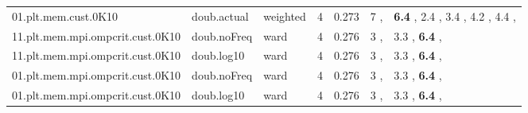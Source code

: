 \begin{table*}[]
{\begin{tabular}{|l|l|l|c|r|l|l|}
 01.plt.mem.cust.0K10             & doub.actual  & weighted      &        4 &     0.273 & 7 ,                & \textbf{6.4} , 2.4 , 3.4 , 4.2 , 4.4 ,       \\
 11.plt.mem.mpi.ompcrit.cust.0K10 & doub.noFreq  & ward          &        4 &     0.276 & 3 ,                & 3.3 , \textbf{6.4} ,                         \\
 11.plt.mem.mpi.ompcrit.cust.0K10 & doub.log10   & ward          &        4 &     0.276 & 3 ,                & 3.3 , \textbf{6.4} ,                         \\
 01.plt.mem.mpi.ompcrit.cust.0K10 & doub.noFreq  & ward          &        4 &     0.276 & 3 ,                & 3.3 , \textbf{6.4} ,                         \\
 01.plt.mem.mpi.ompcrit.cust.0K10 & doub.log10   & ward          &        4 &     0.276 & 3 ,                & 3.3 , \textbf{6.4} ,                         \\
\hline
\end{tabular}}
\end{table*}
